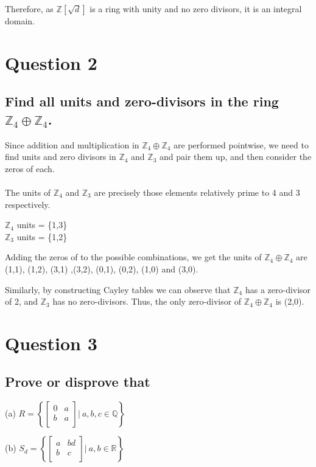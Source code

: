 \documentclass{article}
\begin{document}
Therefore, as \(\mathds{Z}[\sqrt{d}]\) is a ring with unity and no zero divisors, it is an integral domain.
\section*{Question 2}
\subsection*{Find all units and zero-divisors in the ring \(\mathds{Z}_4 \oplus \mathds{Z}_4\).}

\solution
Since addition and multiplication in \(\mathds{Z}_4 \oplus \mathds{Z}_4\) are performed pointwise, we need to find units and zero divisors in \(\mathds{Z}_4\) and \(\mathds{Z}_3\) and pair them up, and then consider the zeros of each.
\\\\
The units of \(\mathds{Z}_4\) and \(\mathds{Z}_3\) are precisely those elements relatively prime to 4 and 3 respectively.

\hspace* \(\mathds{Z}_4\) units = \{1,3\}\\
\hspace* \(\mathds{Z}_3\) units = \{1,2\}

Adding the zeros of to the possible combinations, we get the units of \(\mathds{Z}_4 \oplus \mathds{Z}_4\) are (1,1), (1,2), (3,1) ,(3,2), (0,1), (0,2), (1,0) and (3,0).

Similarly, by constructing Cayley tables we can observe that \(\mathds{Z}_4\) has a zero-divisor of 2, and \(\mathds{Z}_3\) has no zero-divisors. Thus, the only zero-divisor of \(\mathds{Z}_4 \oplus \mathds{Z}_4\) is (2,0).

\pagebreak
\section*{Question 3}
\subsection*{Prove or disprove that}

(a) \(R = \left\{
  \left[ {\begin{array}{cc}
   0 & a \\
   b & a \\
  \end{array} } \right] \rvert\: a,b,c \in \mathds{Q} \right\}
\)

(b) \(S_d = \left\{
  \left[ {\begin{array}{cc}
   a & bd \\
   b & c \\
  \end{array} } \right] \rvert\: a,b \in \mathds{R} \right\}
\)
\end{document}
